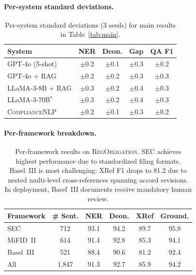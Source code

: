 \documentclass[11pt]{article}
\begin{document}
\paragraph{Per-system standard deviations.}
\begin{table}[h]
\centering
\small
\begin{tabular}{@{}lcccc@{}}
\toprule
\textbf{System} & \textbf{NER} & \textbf{Deon.} & \textbf{Gap} & \textbf{QA F1} \\
\midrule
GPT-4o (5-shot) & $\pm$0.2 & $\pm$0.1 & $\pm$0.3 & $\pm$0.2 \\
GPT-4o + RAG & $\pm$0.2 & $\pm$0.2 & $\pm$0.3 & $\pm$0.3 \\
LLaMA-3-8B + RAG & $\pm$0.3 & $\pm$0.2 & $\pm$0.4 & $\pm$0.3 \\
LLaMA-3-70B$^*$ & $\pm$0.3 & $\pm$0.2 & $\pm$0.4 & $\pm$0.3 \\
\textsc{ComplianceNLP} & $\pm$0.2 & $\pm$0.1 & $\pm$0.3 & $\pm$0.2 \\
\bottomrule
\end{tabular}
\caption{Per-system standard deviations (3 seeds) for main results in Table~\ref{tab:main}.}
\label{tab:main_std}
\end{table}

\paragraph{Per-framework breakdown.}
\begin{table}[h]
\centering
\small
\begin{tabular}{@{}lccccc@{}}
\toprule
\textbf{Framework} & \textbf{\# Sent.} & \textbf{NER} & \textbf{Deon.} & \textbf{XRef} & \textbf{Ground.} \\
\midrule
SEC & 712 & 93.1 & 94.2 & 89.7 & 95.8 \\
MiFID~II & 614 & 91.4 & 92.8 & 85.3 & 94.1 \\
Basel~III & 521 & 88.4 & 90.6 & 81.2 & 92.4 \\
\midrule
All & 1,847 & 91.3 & 92.7 & 85.9 & 94.2 \\
\bottomrule
\end{tabular}
\caption{Per-framework results on \textsc{RegObligation}. SEC achieves highest performance due to standardized filing formats. Basel~III is most challenging: XRef F1 drops to 81.2 due to nested multi-level cross-references spanning accord revisions. In deployment, Basel~III documents receive mandatory human review.}
\label{tab:perframework}
\end{table}
\end{document}
